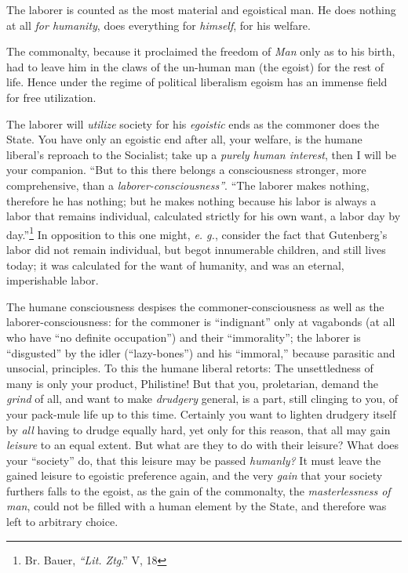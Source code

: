 \documentclass[12pt,a4paper]{book}
\begin{document}
The laborer is counted as the most material and egoistical man. He does 
nothing at all \textit{for humanity}, does everything for \textit{himself}, 
for his welfare.

The commonalty, because it proclaimed the freedom of \textit{Man} only as to 
his birth, had to leave him in the claws of the un-human man (the egoist) for 
the rest of life. Hence under the regime of political liberalism egoism has an 
immense field for free utilization.

The laborer will \textit{utilize} society for his \textit{egoistic} ends as 
the commoner does the State. You have only an egoistic end after all, your 
welfare, is the humane liberal's reproach to the Socialist; take up a 
\textit{purely human interest}, then I will be your companion. ``But to this 
there belongs a consciousness stronger, more comprehensive, than a 
\textit{laborer-consciousness''}. ``The laborer makes nothing, therefore he 
has nothing; but he makes nothing because his labor is always a labor that 
remains individual, calculated strictly for his own want, a labor day by 
day.''\footnote{Br. Bauer, \textit{``Lit. Ztg}.'' V, 18} In opposition to 
this one might, \textit{e. g.}, consider the fact that Gutenberg's labor did 
not remain individual, but begot innumerable children, and still lives today; 
it was calculated for the want of humanity, and was an eternal, imperishable 
labor.

The humane consciousness despises the commoner-consciousness as well as the 
laborer-consciousness: for the commoner is ``indignant'' only at vagabonds 
(at all who have ``no definite occupation'') and their ``immorality''; the 
laborer is ``disgusted'' by the idler (``lazy-bones'') and his 
``immoral,'' because parasitic and unsocial, principles. To this the humane 
liberal retorts: The unsettledness of many is only your product, Philistine! 
But that you, proletarian, demand the \textit{grind} of all, and want to make 
\textit{drudgery} general, is a part, still clinging to you, of your pack-mule 
life up to this time. Certainly you want to lighten drudgery itself by 
\textit{all} having to drudge equally hard, yet only for this reason, that all 
may gain \textit{leisure} to an equal extent. But what are they to do with 
their leisure? What does your ``society'' do, that this leisure may be 
passed \textit{humanly?} It must leave the gained leisure to egoistic 
preference again, and the very \textit{gain} that your society furthers falls 
to the egoist, as the gain of the commonalty, the \textit{masterlessness of 
man}, could not be filled with a human element by the State, and therefore was 
left to arbitrary choice.
\end{document}
